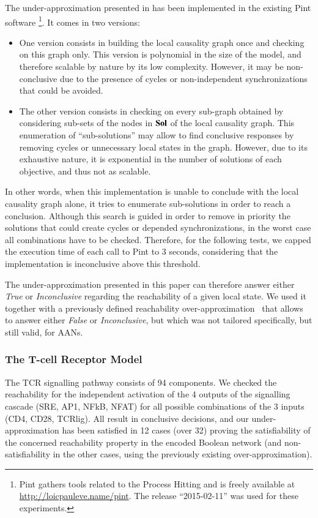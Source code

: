 The under-approximation presented in  has been implemented
in the existing Pint software%
\footnote{Pint gathers tools related to the Process Hitting
and is freely available at \url{http://loicpauleve.name/pint}.
The release “2015-02-11” was used for these experiments.}.
It comes in two versions:
\begin{itemize}
  \item One version consists in building the local causality graph once
    and checking  on this graph only.
    This version is polynomial in the size of the model,
    and therefore scalable by nature by its low complexity.
    However, it may be non-conclusive due to the presence of cycles
    or non-independent synchronizations that could be avoided.
  \item The other version consists in checking 
    on every sub-graph obtained by considering sub-sets of the nodes in $\mathbf{Sol}$
    of the local causality graph.
    This enumeration of “sub-solutions” may allow to find conclusive
    responses by removing cycles or unnecessary local states in the graph.
    However, due to its exhaustive nature,
    it is exponential in the number of solutions of each objective,
    and thus not as scalable.
\end{itemize}
In other words, when this implementation is unable to conclude with the
local causality graph alone, it tries to enumerate sub-solutions
in order to reach a conclusion.
Although this search is guided in order to remove in priority
the solutions that could create cycles or depended synchronizations,
in the worst case all combinations have to be checked.
Therefore, for the following tests, we capped the execution time
of each call to Pint to 3 seconds,
considering that the implementation is inconclusive above this threshold.

The under-approximation presented in this paper can therefore answer
either \emph{True} or \emph{Inconclusive} regarding the reachability
of a given local state.
We used it together with a previously defined
reachability over-approximation~\cite{PMR12-MSCS}
that allows to answer either \emph{False} or \emph{Inconclusive},
but which was not tailored specifically, but still valid, for AANs.

\subsubsection*{The T-cell Receptor Model}

The TCR signalling pathway consists of 94 components.
We checked the reachability for the independent activation of
the 4 outputs of the signalling cascade (SRE, AP1, NFkB, NFAT)
for all possible combinations of the 3 inputs (CD4, CD28, TCRlig).
All result in conclusive decisions,
and our under-approximation has been satisfied in 12 cases (over
32) proving the satisfiability of the concerned reachability property in the encoded Boolean network
(and non-satisfiability in the other cases, using the previously existing over-approximation).

